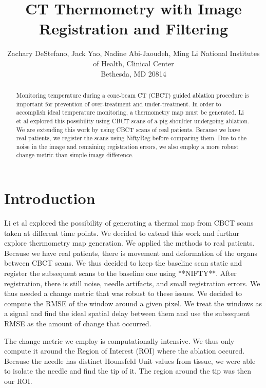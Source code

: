 \documentclass[]{spie}  %
\title{CT Thermometry with Image Registration and Filtering}
\author{Zachary DeStefano\supit{a}, Jack Yao\supit{a}, Nadine Abi-Jaoudeh\supit{a}, Ming Li\supit{a}
\skiplinehalf
\supit{a}National Institutes of Health, Clinical Center\\Bethesda, MD 20814
}
\begin{document}
 
  \maketitle 

\begin{abstract}
Monitoring temperature during a cone-beam CT (CBCT) guided ablation procedure is important for prevention of over-treatment and under-treatment. In order to accomplish ideal temperature monitoring, a thermometry map must be generated.  Li et al explored this possibility using CBCT scans of a pig shoulder undergoing ablation. We are extending this work by using CBCT scans of real patients. Because we have real patients, we register the scans using NiftyReg \cite{Modat10} before comparing them. Due to the noise in the image and remaining registration errors, we also employ a more robust change metric than simple image difference.
\end{abstract}



\section{Introduction}
\label{sec:intro}  %

Li et al explored the possibility of generating a thermal map from CBCT scans taken at different time points. We decided to extend this work and furthur explore thermometry map generation. We applied the methods to real patients. Because we have real patients, there is movement and deformation of the organs between CBCT scans. We thus decided to keep the baseline scan static and register the subsequent scans to the baseline one using **NIFTY**. After registration, there is still noise, needle artifacts, and small registration errors. We thus needed a change metric that was robust to these issues. We decided to compute the RMSE of the window around a given pixel. We treat the windows as a signal and find the ideal spatial delay between them and use the subsequent RMSE as the amount of change that occurred. 

The change metric we employ is computationally intensive. We thus only compute it around the Region of Interest (ROI) where the ablation occured. Because the needle has distinct Hounsfeld Unit values from tissue, we were able to isolate the needle and find the tip of it. The region around the tip was then our ROI. 
\end{document}
